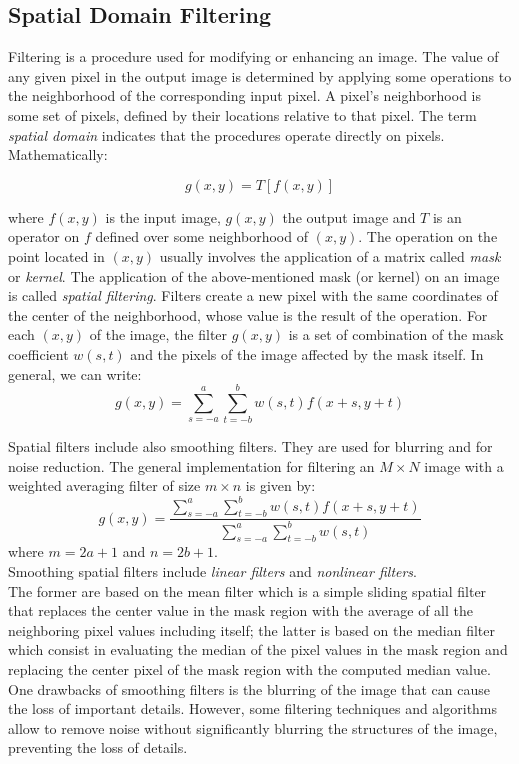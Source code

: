 \documentclass{standalone}
\begin{document}
\subsection{Spatial Domain Filtering}

Filtering is a procedure used for modifying or enhancing an image.
The value of any given pixel in the output image is determined by applying some operations to the neighborhood of the corresponding input pixel.
A pixel's neighborhood is some set of pixels, defined by their locations relative to that pixel.
The term \textit{spatial domain} indicates that the procedures operate directly on pixels.
Mathematically:

\begin{equation}
    g(x,y) = T[f(x,y)] 
\end{equation}

where $f(x, y)$ is the input image, $g(x, y)$ the output image and $T$ is an operator on $f$ defined over some neighborhood of $(x, y)$.
The operation on the point located in $(x, y)$ usually involves the application of a matrix called \textit{mask} or \textit{kernel}.
The application of the above-mentioned mask (or kernel) on an image is called \textit{spatial filtering}.
Filters create a new pixel with the same coordinates of the center of the neighborhood, whose value is the result of the operation.
For each $(x, y)$ of the image, the filter $g(x, y)$ is a set of combination of the mask coefficient $w(s, t)$ and the pixels of the image affected by the mask itself.
In general, we can write:
\begin{equation}
    g(x, y) = \sum_{s = -a}^{a} \sum_{t = -b}^{b} w(s, t) f(x + s, y + t)
\end{equation}  

Spatial filters include also smoothing filters.
They are used for blurring and for noise reduction\cite{corrandconv}.
The general implementation for filtering an $M \times N$ image with a weighted averaging filter of size $m \times n$ is given by:
\begin{equation}
    g(x, y) = \frac{\sum_{s = -a}^{a} \sum_{t = -b}^{b} w(s, t) f(x + s, y + t)}{\sum_{s = -a}^{a} \sum_{t = -b}^{b} w(s, t)}
\end{equation}
where $m=2a+1$ and $n=2b+1$.
\\
Smoothing spatial filters include \textit{linear filters} and \textit{nonlinear filters}\cite{corrandconv}.\\
The former are based on the mean filter which is a simple sliding spatial filter that replaces the center value in the mask region with the average of all the neighboring pixel values including itself; 
the latter is based on the median filter which consist in evaluating the median of the pixel values in the mask region  and replacing the center pixel of the mask region with the computed median value\cite{filters}.
\\
One drawbacks of smoothing filters is the blurring of the image that can cause the loss of important details.
However, some filtering techniques and algorithms allow to remove noise without significantly blurring the structures of the image, preventing the loss of details\cite{nonlocalmeans1}.
\end{document}

